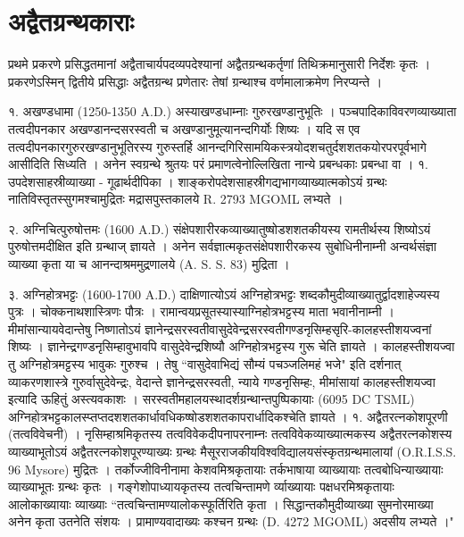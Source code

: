 \chapter{अद्वैतग्रन्थकाराः}
प्रथमे प्रकरणे प्रसिद्धतमानां अद्वैताचार्यपदव्यपदेश्यानां अद्वैतग्रन्थकर्तृणां तिथिक्रमानुसारी निर्देशः कृतः । प्रकरणेऽस्मिन् द्वितीये प्रसिद्धाः अद्वैतग्रन्थ प्रणेतारः तेषां ग्रन्थाश्च वर्णमालाक्रमेण निरप्यन्ते ।

१. अखण्डधामा (1250-1350 A.D.)
अस्याखण्डधाम्नाः गुरुरखण्डानुभूतिः । पञ्चपादिकाविवरणव्याख्याता तत्वदीपनकार अखण्डानन्दसरस्वती च अखण्डानुमूत्यानन्दगिर्योः शिष्यः । यदि स एव तत्वदीपनकारगुरुरखण्डानुभूतिरस्य गुरुस्तर्हि आनन्दगिरिसामयिकस्त्रयोदशचतुर्दशशतकयोरपरपूर्वभागे आसीदिति सिध्यति । अनेन स्वग्रन्थे श्रुतयः परं प्रमाणत्वेनोल्लिखिता नान्ये प्रबन्धकाः प्रबन्धा वा ।
१. उपदेशसाहस्रीव्याख्या - गूढार्थदीपिका ।
शाङ्करोपदेशसाहस्रीगद्यभागव्याख्यात्मकोऽयं ग्रन्थः नातिविस्तृतस्सुगमश्चामुद्रितः मद्रासपुस्तकालये R. 2793 MGOML लभ्यते ।

२. अग्निचित्पुरुषोत्तमः (1600 A.D.)
संक्षेपशारीरकव्याख्यातुष्षोडशशतकीयस्य रामतीर्थस्य शिष्योऽयं पुरुषोत्तमदीक्षित इति ग्रन्थाज् ज्ञायते । अनेन सर्वज्ञात्मकृतसंक्षेपशारीरकस्य सुबोधिनीनाम्नी अन्वर्थसंज्ञा व्याख्या कृता या च आनन्दाश्रममुद्रणालये (A. S. S. 83) मुद्रिता ।

३. अग्निहोत्रभट्टः (1600-1700 A.D.)
दाक्षिणात्योऽयं अग्निहोत्रभट्टः शब्दकौमुदीव्याख्यातुर्द्वादशाहेज्यस्य पुत्रः । चोक्कनाथशास्त्रिणः पौत्रः । रामान्वयप्रसूतस्यास्याग्निहोत्रभट्टस्य माता भवानीनाम्नी । मीमांसान्यायवेदान्तेषु निष्णातोऽयं ज्ञानेन्द्रसरस्वतीवासुदेवेन्द्रसरस्वतीगण्डनृसिम्हसृरि-कालहस्तीशयज्वनां शिष्यः । ज्ञानेन्द्रगण्डनृसिम्हावुभावपि वासुदेवेन्द्रशिष्यौ अग्निहोत्रभट्टस्य गुरू चेति ज्ञायते । कालहस्तीशयज्वा तु अग्निहोत्रमट्टस्य भावुकः गुरुश्च । तेषु ``वासुदेवाभिद्यं सौम्यं पचञ्जलिमहं भजे" इति दर्शनात् व्याकरणशास्त्रे गुरुर्वासुदेवेन्द्रः, वेदान्ते ज्ञानेन्द्रसरस्वती, न्याये गण्डनृसिम्हः, मीमांसायां कालहस्तीशयज्वा इत्यादि ऊहितुं अस्त्यवकाशः ।
सरस्वतीमहालयस्थादर्शग्रन्थान्तपुष्पिकायाः (6095 DC TSML) अग्निहोत्रभट्टकालस्प्तप्तदशशतकार्धावधिकष्षोडशशतकापरार्धादिकश्चेति ज्ञायते ।
१. अद्वैतरत्नकोशपूरणी (तत्वविवेचनी) ।
नृसिम्हाश्रमिकृतस्य तत्वविवेकदीपनापरनाम्नः तत्वविवेकव्याख्यात्मकस्य अद्वैतरत्नकोशस्य व्याख्याभूतोऽयं अद्वैतरत्नकोशपूरण्याख्यः ग्रन्थः मैसूरराजकीयविश्वविद्यालयसंस्कृतग्रन्थमालायां (O.R.I.S.S. 96 Mysore) मुद्रितः ।
तर्कोज्जीविनीनामा केशवमिश्रकृतायाः तर्कभाषाया व्याख्यायाः तत्वबोधिन्याख्यायाः व्याख्याभूतः ग्रन्थः कृतः । गङ्गेशोपाध्यायकृतस्य तत्वचिन्तामणे र्व्याख्यायाः पक्षधरमिश्रकृतायाः आलोकाख्यायाः व्याख्याः ``तत्वचिन्तामण्यालोकस्फूर्तिरिति कृता । सिद्धान्तकौमुदीव्याख्या सुमनोरमाख्या अनेन कृता उतनेति संशयः । प्रामाण्यवादाख्यः कश्चन ग्रन्थः (D. 4272 MGOML) अदसीय लभ्यते ।"

